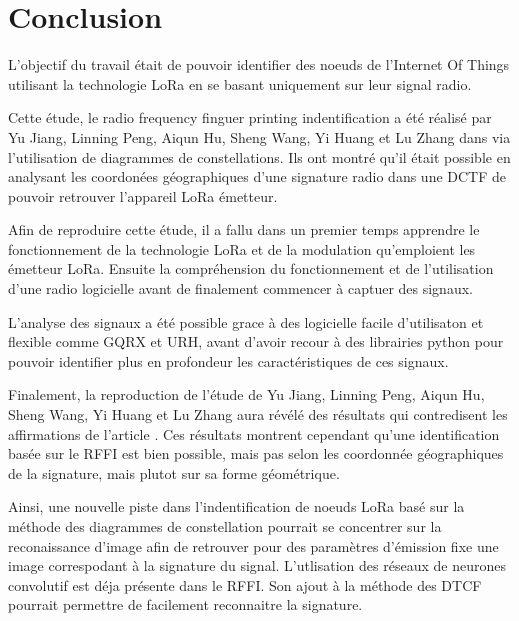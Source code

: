 \chapter*{Conclusion}
\renewcommand{\leftmark}{CONCLUSION}

L'objectif du travail était de pouvoir identifier des noeuds de l'Internet Of Things utilisant la technologie LoRa en se basant uniquement sur leur signal radio.

\vspace{0.1cm}

Cette étude, le radio frequency finguer printing indentification a été réalisé par Yu Jiang, Linning Peng, Aiqun Hu, Sheng Wang, Yi Huang et Lu Zhang dans \cite{loraDCTF} via l'utilisation de diagrammes de constellations. Ils ont montré qu'il était possible en analysant les coordonées géographiques d'une signature radio dans une DCTF de pouvoir retrouver l'appareil LoRa émetteur.

\vspace{0.1cm}

Afin de reproduire cette étude, il a fallu dans un premier temps apprendre le fonctionnement de la technologie LoRa et  de la modulation qu'emploient les émetteur LoRa. Ensuite la compréhension du fonctionnement et de l'utilisation d'une radio logicielle avant de finalement commencer à captuer des signaux.

\vspace{0.1cm}

L'analyse des signaux a été possible grace à des logicielle facile d'utilisaton et flexible comme GQRX et URH, avant d'avoir recour à des librairies python pour pouvoir identifier plus en profondeur les caractéristiques de ces signaux.

\vspace{0.1cm}

Finalement, la reproduction de l'étude de Yu Jiang, Linning Peng, Aiqun Hu, Sheng Wang, Yi Huang et Lu Zhang aura révélé des résultats qui contredisent les affirmations de l'article \cite{loraDCTF}. Ces résultats montrent cependant qu'une identification basée sur le RFFI est bien possible, mais pas selon les coordonnée géographiques de la signature, mais plutot sur sa forme géométrique.

\vspace{0.1cm}

Ainsi, une nouvelle piste dans l'indentification de noeuds LoRa basé sur la méthode des diagrammes de constellation pourrait se concentrer sur la reconaissance d'image afin de retrouver pour des paramètres d'émission fixe une image correspodant à la signature du signal. L'utlisation des réseaux de neurones convolutif est déja présente dans le RFFI. Son ajout à la méthode des DTCF pourrait permettre de facilement reconnaitre la signature.